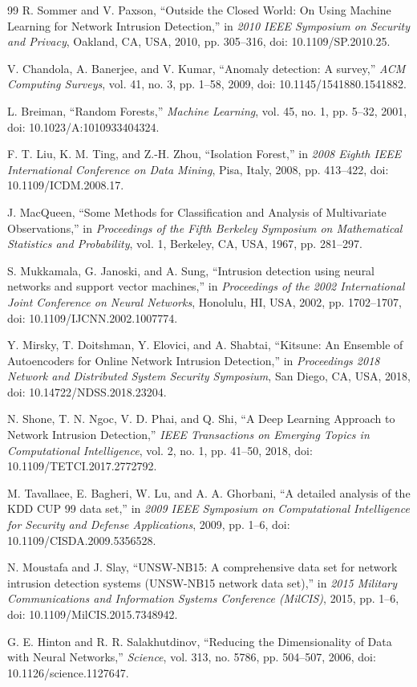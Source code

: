 \documentclass[conference]{IEEEtran}
\begin{document}
\begin{thebibliography}{99}
R. Sommer and V. Paxson, ``Outside the Closed World: On Using Machine Learning for Network Intrusion Detection,'' in \emph{2010 IEEE Symposium on Security and Privacy}, Oakland, CA, USA, 2010, pp. 305--316, doi: 10.1109/SP.2010.25.

V. Chandola, A. Banerjee, and V. Kumar, ``Anomaly detection: A survey,'' \emph{ACM Computing Surveys}, vol. 41, no. 3, pp. 1--58, 2009, doi: 10.1145/1541880.1541882.

L. Breiman, ``Random Forests,'' \emph{Machine Learning}, vol. 45, no. 1, pp. 5--32, 2001, doi: 10.1023/A:1010933404324.

F. T. Liu, K. M. Ting, and Z.-H. Zhou, ``Isolation Forest,'' in \emph{2008 Eighth IEEE International Conference on Data Mining}, Pisa, Italy, 2008, pp. 413--422, doi: 10.1109/ICDM.2008.17.

J. MacQueen, ``Some Methods for Classification and Analysis of Multivariate Observations,'' in \emph{Proceedings of the Fifth Berkeley Symposium on Mathematical Statistics and Probability}, vol. 1, Berkeley, CA, USA, 1967, pp. 281--297.

S. Mukkamala, G. Janoski, and A. Sung, ``Intrusion detection using neural networks and support vector machines,'' in \emph{Proceedings of the 2002 International Joint Conference on Neural Networks}, Honolulu, HI, USA, 2002, pp. 1702--1707, doi: 10.1109/IJCNN.2002.1007774.

Y. Mirsky, T. Doitshman, Y. Elovici, and A. Shabtai, ``Kitsune: An Ensemble of Autoencoders for Online Network Intrusion Detection,'' in \emph{Proceedings 2018 Network and Distributed System Security Symposium}, San Diego, CA, USA, 2018, doi: 10.14722/NDSS.2018.23204.

N. Shone, T. N. Ngoc, V. D. Phai, and Q. Shi, ``A Deep Learning Approach to Network Intrusion Detection,'' \emph{IEEE Transactions on Emerging Topics in Computational Intelligence}, vol. 2, no. 1, pp. 41--50, 2018, doi: 10.1109/TETCI.2017.2772792.

M. Tavallaee, E. Bagheri, W. Lu, and A. A. Ghorbani, ``A detailed analysis of the KDD CUP 99 data set,'' in \emph{2009 IEEE Symposium on Computational Intelligence for Security and Defense Applications}, 2009, pp. 1--6, doi: 10.1109/CISDA.2009.5356528.

N. Moustafa and J. Slay, ``UNSW-NB15: A comprehensive data set for network intrusion detection systems (UNSW-NB15 network data set),'' in \emph{2015 Military Communications and Information Systems Conference (MilCIS)}, 2015, pp. 1--6, doi: 10.1109/MilCIS.2015.7348942.

G. E. Hinton and R. R. Salakhutdinov, ``Reducing the Dimensionality of Data with Neural Networks,'' \emph{Science}, vol. 313, no. 5786, pp. 504--507, 2006, doi: 10.1126/science.1127647.

\end{thebibliography}
\end{document}
